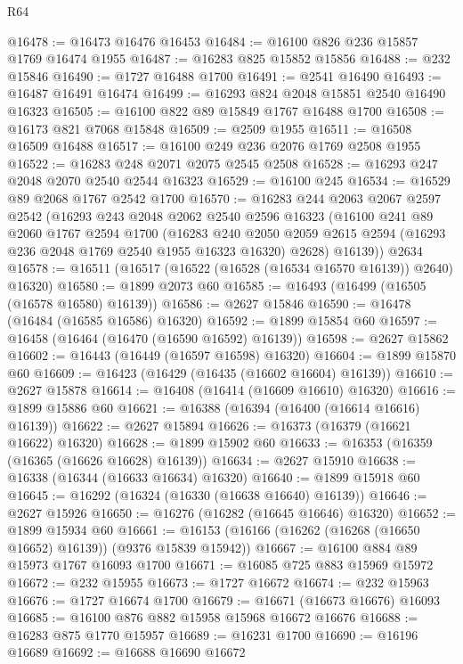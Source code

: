 \begin{lexlean}{R64}
\begin{coremodule}
@16478 := @16473 @16476 @16453
@16484 := @16100 @826 @236 @15857 @1769 @16474 @1955
@16487 := @16283 @825 @15852 @15856
@16488 := @232 @15846
@16490 := @1727 @16488 @1700
@16491 := @2541 @16490
@16493 := @16487 @16491 @16474
@16499 := @16293 @824 @2048 @15851 @2540 @16490 @16323
@16505 := @16100 @822 @89 @15849 @1767 @16488 @1700
@16508 := @16173 @821 @7068 @15848
@16509 := @2509 @1955
@16511 := @16508 @16509 @16488
@16517 := @16100 @249 @236 @2076 @1769 @2508 @1955
@16522 := @16283 @248 @2071 @2075 @2545 @2508
@16528 := @16293 @247 @2048 @2070 @2540 @2544 @16323
@16529 := @16100 @245
@16534 := @16529 @89 @2068 @1767 @2542 @1700
@16570 := @16283
    @244
    @2063
    @2067
    @2597
    @2542
    (@16293
      @243
      @2048
      @2062
      @2540
      @2596
      @16323
      (@16100
        @241
        @89
        @2060
        @1767
        @2594
        @1700
        (@16283
          @240
          @2050
          @2059
          @2615
          @2594
          (@16293 @236 @2048 @1769 @2540 @1955 @16323 @16320)
          @2628)
        @16139))
    @2634
@16578 := @16511 (@16517 (@16522 (@16528 (@16534 @16570 @16139)) @2640) @16320)
@16580 := @1899 @2073 @60
@16585 := @16493 (@16499 (@16505 (@16578 @16580) @16139))
@16586 := @2627 @15846
@16590 := @16478 (@16484 (@16585 @16586) @16320)
@16592 := @1899 @15854 @60
@16597 := @16458 (@16464 (@16470 (@16590 @16592) @16139))
@16598 := @2627 @15862
@16602 := @16443 (@16449 (@16597 @16598) @16320)
@16604 := @1899 @15870 @60
@16609 := @16423 (@16429 (@16435 (@16602 @16604) @16139))
@16610 := @2627 @15878
@16614 := @16408 (@16414 (@16609 @16610) @16320)
@16616 := @1899 @15886 @60
@16621 := @16388 (@16394 (@16400 (@16614 @16616) @16139))
@16622 := @2627 @15894
@16626 := @16373 (@16379 (@16621 @16622) @16320)
@16628 := @1899 @15902 @60
@16633 := @16353 (@16359 (@16365 (@16626 @16628) @16139))
@16634 := @2627 @15910
@16638 := @16338 (@16344 (@16633 @16634) @16320)
@16640 := @1899 @15918 @60
@16645 := @16292 (@16324 (@16330 (@16638 @16640) @16139))
@16646 := @2627 @15926
@16650 := @16276 (@16282 (@16645 @16646) @16320)
@16652 := @1899 @15934 @60
@16661 := @16153 (@16166 (@16262 (@16268 (@16650 @16652) @16139)) (@9376 @15839 @15942))
@16667 := @16100 @884 @89 @15973 @1767 @16093 @1700
@16671 := @16085 @725 @883 @15969 @15972
@16672 := @232 @15955
@16673 := @1727 @16672
@16674 := @232 @15963
@16676 := @1727 @16674 @1700
@16679 := @16671 (@16673 @16676) @16093
@16685 := @16100 @876 @882 @15958 @15968 @16672 @16676
@16688 := @16283 @875 @1770 @15957
@16689 := @16231 @1700
@16690 := @16196 @16689
@16692 := @16688 @16690 @16672

\end{coremodule}
\end{lexlean}
